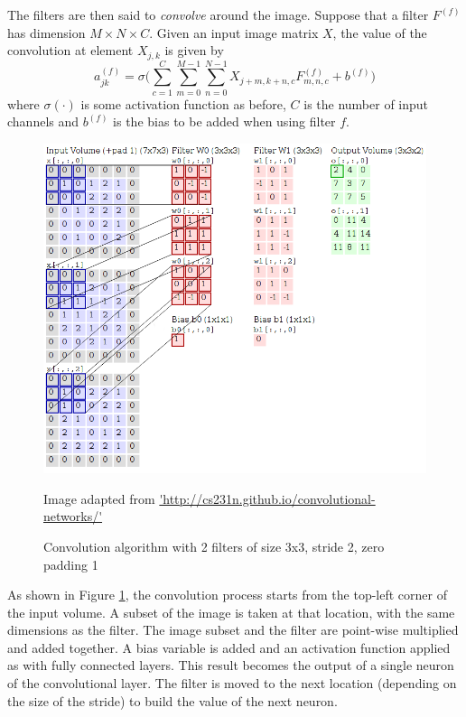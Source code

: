 The filters are then said to \textit{convolve} around the image. Suppose that a filter $F^{(f)}$ has dimension $M\times N \times C$. Given an input image matrix $X$, the value of the convolution at element $X_{j,k}$ is given by
\[
	a_{jk}^{(f)} = \sigma\bigg(\sum_{c=1}^C\sum_{m=0}^{M-1}\sum_{n=0}^{N-1}X_{j+m, k+n, c}F_{m,n,c}^{(f)}  + b^{(f)}\bigg)
\]
where $\sigma(\cdot)$ is some activation function as before, $C$ is the number of input channels and $b^{(f)}$ is the bias to be added when using filter $f$. 

\begin{figure}[ht]
	\centering
	\includegraphics[scale=0.5]{Images/3_convolution.png}
	\caption{Convolution algorithm with 2 filters of size 3x3, stride 2, zero padding 1}
	\small Image adapted from \url{'http://cs231n.github.io/convolutional-networks/'}
	\label{convnets-conv-alg}
\end{figure}

As shown in Figure \ref{convnets-conv-alg}, the convolution process starts from the top-left corner of the input volume. A subset of the image is taken at that location, with the same dimensions as the filter. The image subset and the filter are point-wise multiplied and added together. A bias variable is added and an activation function applied as with fully connected layers. This result becomes the output of a single neuron of the convolutional layer. The filter is moved to the next location (depending on the size of the stride) to build the value of the next neuron.

